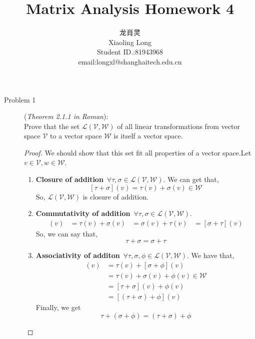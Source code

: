 \documentclass[a4paper]{article}
\title{Matrix Analysis Homework 4}
\author{龙肖灵 \\Xiaoling Long\\Student ID.:81943968\\email:longxl@shanghaitech.edu.cn}
\begin{document}
\maketitle

\begin{description}
\item[Problem 1](\textit{Theorem 2.1.1 in Roman}):\\
Prove that the set $\mathcal{L}(\mathcal{V},\mathcal{W})$ of all linear transformations from vector space $\mathcal{V}$ to a vector space $\mathcal{W}$ is itself a vector space.

\begin{proof}
  We should show that this set fit all properties of a vector space.Let $v \in \mathcal{V} , w \in \mathcal{W} $.
  \begin{enumerate}[ 1) ]
    \item \textbf{Closure of addition}\ $\forall \tau,\sigma \in \mathcal{L}\left(\mathcal{V},\mathcal{W}\right)$.
    We can get that,
      $$[\tau+\sigma](v)=\tau(v)+\sigma(v) \in \mathcal{W}$$
      So, $\mathcal{L}\left(\mathcal{V},\mathcal{W}\right)$ is closure of addition.
    \item \textbf{Commutativity of addition}\ $\forall \tau,\sigma \in \mathcal{L}\left(\mathcal{V},\mathcal{W}\right)$.
    \begin{align*}
      [\tau+\sigma](v)&=\tau(v)+\sigma(v)
      &=\sigma(v)+\tau(v)
      &=[\sigma+\tau](v)
    \end{align*}
    So, we can say that,$$\tau+\sigma=\sigma+\tau$$
    \item \textbf{Associativity of additon}\  $\forall \tau,\sigma,\phi \in \mathcal{L}\left(\mathcal{V},\mathcal{W}\right)$. We have that,
    \begin{align*}
      [\tau+(\sigma+\phi)](v)&=\tau(v)+[\sigma+\phi](v)\\
      &=\tau(v)+\sigma(v)+\phi(v) \in \mathcal{W}\\
      &=[\tau+\sigma](v)+\phi(v)\\
      &=[(\tau+\sigma)+\phi](v)
    \end{align*}
    Finally, we get $$\tau+(\sigma+\phi)=(\tau+\sigma)+\phi$$


\end{enumerate}
\end{proof}
\end{description}
\end{document}
